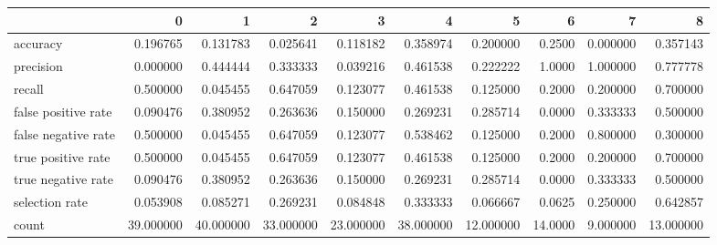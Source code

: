 \begin{tabular}{lrrrrrrrrr}
\toprule
{} &          0 &          1 &          2 &          3 &          4 &          5 &        6 &         7 &          8 \\
\midrule
accuracy            &   0.196765 &   0.131783 &   0.025641 &   0.118182 &   0.358974 &   0.200000 &   0.2500 &  0.000000 &   0.357143 \\
precision           &   0.000000 &   0.444444 &   0.333333 &   0.039216 &   0.461538 &   0.222222 &   1.0000 &  1.000000 &   0.777778 \\
recall              &   0.500000 &   0.045455 &   0.647059 &   0.123077 &   0.461538 &   0.125000 &   0.2000 &  0.200000 &   0.700000 \\
false positive rate &   0.090476 &   0.380952 &   0.263636 &   0.150000 &   0.269231 &   0.285714 &   0.0000 &  0.333333 &   0.500000 \\
false negative rate &   0.500000 &   0.045455 &   0.647059 &   0.123077 &   0.538462 &   0.125000 &   0.2000 &  0.800000 &   0.300000 \\
true positive rate  &   0.500000 &   0.045455 &   0.647059 &   0.123077 &   0.461538 &   0.125000 &   0.2000 &  0.200000 &   0.700000 \\
true negative rate  &   0.090476 &   0.380952 &   0.263636 &   0.150000 &   0.269231 &   0.285714 &   0.0000 &  0.333333 &   0.500000 \\
selection rate      &   0.053908 &   0.085271 &   0.269231 &   0.084848 &   0.333333 &   0.066667 &   0.0625 &  0.250000 &   0.642857 \\
count               &  39.000000 &  40.000000 &  33.000000 &  23.000000 &  38.000000 &  12.000000 &  14.0000 &  9.000000 &  13.000000 \\
\bottomrule
\end{tabular}
